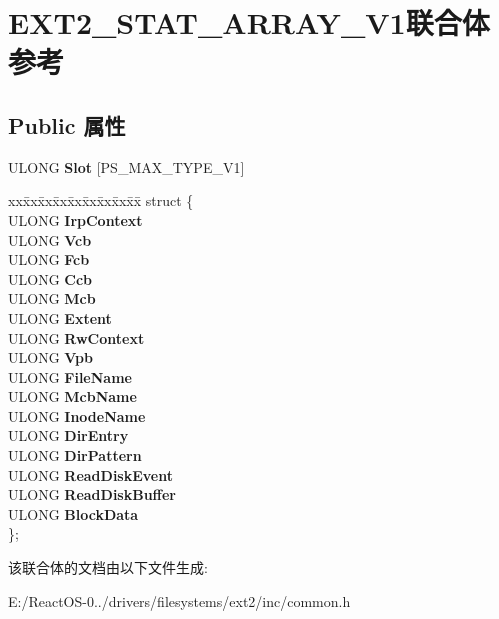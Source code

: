 \hypertarget{union_e_x_t2___s_t_a_t___a_r_r_a_y___v1}{}\section{E\+X\+T2\+\_\+\+S\+T\+A\+T\+\_\+\+A\+R\+R\+A\+Y\+\_\+\+V1联合体 参考}
\label{union_e_x_t2___s_t_a_t___a_r_r_a_y___v1}
\subsection*{Public 属性}
\begin{DoxyCompactItemize}
\item 
\mbox{\label{union_e_x_t2___s_t_a_t___a_r_r_a_y___v1_ac39fda4ff8ea429523d920553e082788}} 
U\+L\+O\+NG {\bfseries Slot} \mbox{[}P\+S\+\_\+\+M\+A\+X\+\_\+\+T\+Y\+P\+E\+\_\+\+V1\mbox{]}
\item 
\mbox{\label{union_e_x_t2___s_t_a_t___a_r_r_a_y___v1_ae6c611a16b51ba81bbac9932cd6adecf}} 
\begin{tabbing}
xx\=xx\=xx\=xx\=xx\=xx\=xx\=xx\=xx\=\kill
struct \{\\
\>ULONG {\bfseries IrpContext}\\
\>ULONG {\bfseries Vcb}\\
\>ULONG {\bfseries Fcb}\\
\>ULONG {\bfseries Ccb}\\
\>ULONG {\bfseries Mcb}\\
\>ULONG {\bfseries Extent}\\
\>ULONG {\bfseries RwContext}\\
\>ULONG {\bfseries Vpb}\\
\>ULONG {\bfseries FileName}\\
\>ULONG {\bfseries McbName}\\
\>ULONG {\bfseries InodeName}\\
\>ULONG {\bfseries DirEntry}\\
\>ULONG {\bfseries DirPattern}\\
\>ULONG {\bfseries ReadDiskEvent}\\
\>ULONG {\bfseries ReadDiskBuffer}\\
\>ULONG {\bfseries BlockData}\\
\}; \\

\end{tabbing}\end{DoxyCompactItemize}


该联合体的文档由以下文件生成\+:\begin{DoxyCompactItemize}
\item 
E\+:/\+React\+O\+S-\/0../drivers/filesystems/ext2/inc/common.\+h\end{DoxyCompactItemize}
